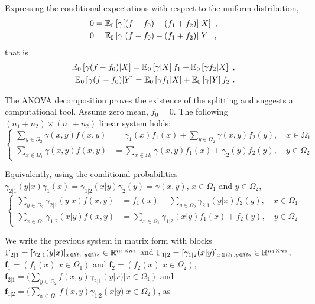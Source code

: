 \documentclass[runningheads]{llncs}
\begin{document}
Expressing the conditional expectations with respect to the uniform distribution,
%
  \begin{align*}
    0 &= {\operatorname{\mathbb E}}_{0}\left[\gamma[(f-f_0) - (f_1+f_2)] \middle| X\right] \ , \\
   0 &= {\operatorname{\mathbb E}}_{0}\left[\gamma[(f-f_0) - (f_1+f_2)] \middle| Y\right] \ ,
  \end{align*}
that is
%
  \begin{align*}
  {\operatorname{\mathbb E}}_{0}\left[\gamma(f-f_0) \middle| X\right] =  {\operatorname{\mathbb E}}_{0}\left[\gamma \middle| X\right] f_1 + {\operatorname{\mathbb E}}_{0}\left[\gamma f_2 \middle| X\right] \ , \\
    {\operatorname{\mathbb E}}_{0}\left[\gamma(f-f_0) \middle| Y\right] =  {\operatorname{\mathbb E}}_{0}\left[\gamma f_1 \middle| X\right]  + {\operatorname{\mathbb E}}_{0}\left[\gamma \middle| Y\right] f_2\ .
  \end{align*}

The ANOVA decomposition proves the existence of the splitting and suggests a computational tool. Assume zero mean, $f_0=0$. The following $(n_1+n_2)\times(n_1+n_2)$ linear system holds:
%
\begin{equation*}
\begin{cases}
  \sum_{y \in \Omega_2} \gamma(x,y)f(x,y) &= \gamma_1(x) f_1(x) + \sum_{y \in \Omega_2} \gamma(x,y) f_2(y) , \quad x \in \Omega_1 \\
  \sum_{x \in \Omega_1} \gamma(x,y)f(x,y) &= \sum_{x \in \Omega_1} \gamma(x,y) f_1(x)  + \gamma_2(y)f_2(y) , \quad y \in \Omega_2
\end{cases}
\end{equation*}
%

Equivalently, using the conditional probabilities $\gamma_{2|1}(y|x) \gamma_1(x) = \gamma_{1|2}(x|y) \gamma_2(y) = \gamma(x,y)$, $x \in \Omega_1$ and $y \in \Omega_2$,
%
\begin{equation*}
\begin{cases}
  \sum_{y \in \Omega_2} \gamma_{2|1}(y|x)f(x,y) &= f_1(x) + \sum_{y \in \Omega_2} \gamma_{2|1}(y|x) f_2(y) , \quad x \in \Omega_1 \\
  \sum_{x \in \Omega_1} \gamma_{1|2}(x|y)f(x,y) &= \sum_{x \in \Omega_1} \gamma_{1|2}(x|y) f_1(x)  + f_2(y) , \quad y \in \Omega_2
\end{cases}
\end{equation*}
%

We write the previous system in matrix form with blocks $\Gamma_{2|1} = [\gamma_{2|1}(y|x)]_{x \in \Omega_1, y \in \Omega_2} \in \mathbb R^{n_1 \times n_2}$ and $\Gamma_{1|2} = [\gamma_{1|2}(x|y)]_{x \in \Omega_1, y \in \Omega_2} \in \mathbb R^{n_1 \times n_2}$, $\bm f_1 = (f_1(x) | x \in \Omega_1)$ and $\bm f_2 = (f_2(x) | x \in \Omega_2)$, $\bm f_{2|1} = (\sum_{y \in \Omega_2} f(x,y)\gamma_{2|1}(y|x) | x \in \Omega_1)$ and $\bm f_{1|2} = (\sum_{x\in\Omega_1} f(x,y)\gamma_{1|2}(x|y) | x \in \Omega_2)$, as 
\end{document}
